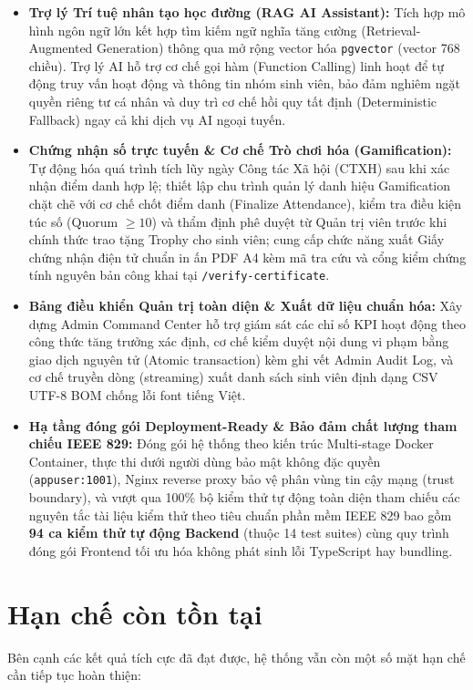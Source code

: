 \begin{itemize}[leftmargin=*]
    \item \textbf{Trợ lý Trí tuệ nhân tạo học đường (RAG AI Assistant):} Tích hợp mô hình ngôn ngữ lớn kết hợp tìm kiếm ngữ nghĩa tăng cường (Retrieval-Augmented Generation) thông qua mở rộng vector hóa \texttt{pgvector} (vector 768 chiều). Trợ lý AI hỗ trợ cơ chế gọi hàm (Function Calling) linh hoạt để tự động truy vấn hoạt động và thông tin nhóm sinh viên, bảo đảm nghiêm ngặt quyền riêng tư cá nhân và duy trì cơ chế hồi quy tất định (Deterministic Fallback) ngay cả khi dịch vụ AI ngoại tuyến.
    
    \item \textbf{Chứng nhận số trực tuyến \& Cơ chế Trò chơi hóa (Gamification):} Tự động hóa quá trình tích lũy ngày Công tác Xã hội (CTXH) sau khi xác nhận điểm danh hợp lệ; thiết lập chu trình quản lý danh hiệu Gamification chặt chẽ với cơ chế chốt điểm danh (Finalize Attendance), kiểm tra điều kiện túc số (Quorum $\ge 10$) và thẩm định phê duyệt từ Quản trị viên trước khi chính thức trao tặng Trophy cho sinh viên; cung cấp chức năng xuất Giấy chứng nhận điện tử chuẩn in ấn PDF A4 kèm mã tra cứu và cổng kiểm chứng tính nguyên bản công khai tại \texttt{/verify-certificate}.
    
    \item \textbf{Bảng điều khiển Quản trị toàn diện \& Xuất dữ liệu chuẩn hóa:} Xây dựng Admin Command Center hỗ trợ giám sát các chỉ số KPI hoạt động theo công thức tăng trưởng xác định, cơ chế kiểm duyệt nội dung vi phạm bằng giao dịch nguyên tử (Atomic transaction) kèm ghi vết Admin Audit Log, và cơ chế truyền dòng (streaming) xuất danh sách sinh viên định dạng CSV UTF-8 BOM chống lỗi font tiếng Việt.
    
    \item \textbf{Hạ tầng đóng gói Deployment-Ready \& Bảo đảm chất lượng tham chiếu IEEE 829:} Đóng gói hệ thống theo kiến trúc Multi-stage Docker Container, thực thi dưới người dùng bảo mật không đặc quyền (\texttt{appuser:1001}), Nginx reverse proxy bảo vệ phân vùng tin cậy mạng (trust boundary), và vượt qua 100\% bộ kiểm thử tự động toàn diện tham chiếu các nguyên tắc tài liệu kiểm thử theo tiêu chuẩn phần mềm IEEE 829\cite{ieee829test} bao gồm \textbf{94 ca kiểm thử tự động Backend} (thuộc 14 test suites) cùng quy trình đóng gói Frontend tối ưu hóa không phát sinh lỗi TypeScript hay bundling.
\end{itemize}

\section{Hạn chế còn tồn tại}
Bên cạnh các kết quả tích cực đã đạt được, hệ thống vẫn còn một số mặt hạn chế cần tiếp tục hoàn thiện:

